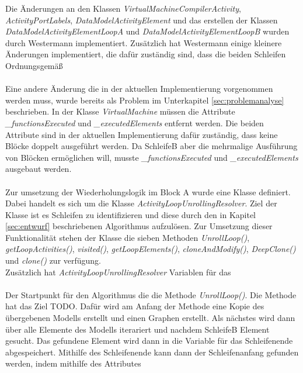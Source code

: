     Die Änderungen an den Klassen \textit{VirtualMachineCompilerActivity}, \textit{ActivityPortLabels}, \textit{DataModelActivityElement} und das erstellen der Klassen \textit{DataModelActivityElementLoopA} und \textit{DataModelActivityElementLoopB} wurden durch Westermann implementiert.
    Zusätzlich hat Westermann einige kleinere Änderungen implementiert, die dafür zuständig sind, dass die beiden Schleifen Ordnungsgemäß \\ %
    \\
    Eine andere Änderung die in der aktuellen Implementierung vorgenommen werden muss, wurde bereits als Problem im Unterkapitel \cref{sec:problemanalyse} beschrieben.
    In der Klasse \textit{VirtualMachine} müssen die Attribute \textit{_functionsExecuted} und \textit{_executedElements} entfernt werden.
    Die beiden Attribute sind in der aktuellen Implementierung dafür zuständig, dass keine Blöcke doppelt ausgeführt werden. 
    Da SchleifeB aber die mehrmalige Ausführung von Blöcken ermöglichen will, musste \textit{_functionsExecuted} und \textit{_executedElements} ausgebaut werden.\\
    \\
    Zur umsetzung der Wiederholungslogik im Block A wurde eine Klasse definiert.
    Dabei handelt es sich um die Klasse \textit{ActivityLoopUnrollingResolver}.
    Ziel der Klasse ist es Schleifen zu identifizieren und diese durch den in Kapitel \cref{sec:entwurf} beschriebenen Algorithmus aufzulösen.
    Zur Umsetzung dieser Funktionalität stehen der Klasse die sieben Methoden \textit{UnrollLoop()}, \textit{getLoopActivities()}, \textit{visited()}, \textit{getLoopElements()}, \textit{cloneAndModify()}, \textit{DeepClone()} und \textit{clone()} zur verfügung.\\
    Zusätzlich hat \textit{ActivityLoopUnrollingResolver} Variablen für das 
    \\
    \\
    Der Startpunkt für den Algorithmus die die Methode \textit{UnrollLoop()}.
    Die Methode hat das Ziel TODO.
    Dafür wird am Anfang der Methode eine Kopie des übergebenen Modells erstellt und einen Graphen erstellt.
    Als nächstes wird dann über alle Elemente des Modells iterariert und nachdem SchleifeB Element gesucht.
    Das gefundene Element wird dann in die Variable für das Schleifenende abgespeichert.
    Mithilfe des Schleifenende kann dann der Schleifenanfang gefunden werden, indem mithilfe des Attributes 
    \\
    \\
